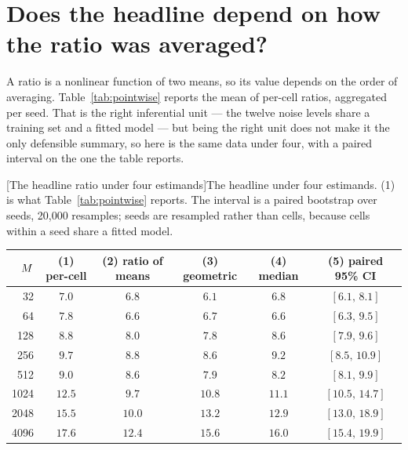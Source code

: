 
\section{Does the headline depend on how the ratio was averaged?}
\label{app:aggregation}

A ratio is a nonlinear function of two means, so its value depends on the order
of averaging. Table~\ref{tab:pointwise} reports the mean of per-cell
ratios, aggregated per seed. That is the right inferential unit --- the twelve
noise levels share a training set and a fitted model --- but being the right
unit does not make it the only defensible summary, so here is the same data
under four, with a paired interval on the one the table reports.

\begin{center}
\begin{minipage}{\linewidth}\small\centering
{}[The headline ratio under four estimands]{The headline under four estimands. (1) is what
Table~\ref{tab:pointwise} reports. The interval is a paired bootstrap over
seeds, 20,000 resamples; seeds are resampled rather than cells, because cells
within a seed share a fitted model.}
\label{tab:aggregation}
\begin{tabular}{rccccc}
\toprule
$M$ & (1) per-cell & (2) ratio of means & (3) geometric & (4) median
        & (5) paired 95\% CI \\
\midrule
32 & $7.0$ & $6.8$ & $6.1$ & $6.8$ & $[6.1,\,8.1]$ \\
64 & $7.8$ & $6.6$ & $6.7$ & $6.6$ & $[6.3,\,9.5]$ \\
128 & $8.8$ & $8.0$ & $7.8$ & $8.6$ & $[7.9,\,9.6]$ \\
256 & $9.7$ & $8.8$ & $8.6$ & $9.2$ & $[8.5,\,10.9]$ \\
512 & $9.0$ & $8.6$ & $7.9$ & $8.2$ & $[8.1,\,9.9]$ \\
1024 & $12.5$ & $9.7$ & $10.8$ & $11.1$ & $[10.5,\,14.7]$ \\
2048 & $15.5$ & $10.0$ & $13.2$ & $12.9$ & $[13.0,\,18.9]$ \\
4096 & $17.6$ & $12.4$ & $15.6$ & $16.0$ & $[15.4,\,19.9]$ \\
\bottomrule
\end{tabular}
\end{minipage}
\end{center}

